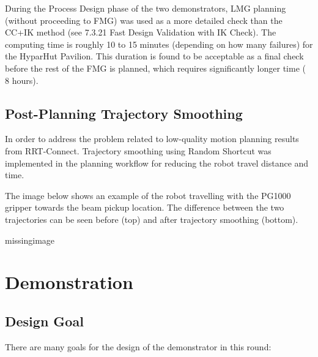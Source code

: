 During the Process Design phase of the two demonstrators, LMG planning (without proceeding to FMG) was used as a more detailed check than the CC+IK method (see 7.3.21 Fast Design Validation with IK Check). The computing time is roughly 10 to 15 minutes (depending on how many failures) for the HyparHut Pavilion. This duration is found to be acceptable as a final check before the rest of the FMG is planned, which requires significantly longer time (~ 8 hours).

\subsection{Post-Planning Trajectory Smoothing}
In order to address the problem related to low-quality motion planning results from RRT-Connect. Trajectory smoothing using Random Shortcut \parencite{zhaoTrajectorySmoothingUsing2015} was implemented in the planning workflow for reducing the robot travel distance and time.

The image below shows an example of the robot travelling with the PG1000 gripper towards the beam pickup location. The difference between the two trajectories can be seen before (top) and after trajectory smoothing (bottom). 

missingimage

\section{Demonstration}
\subsection{Design Goal}
There are many goals for the design of the demonstrator in this round:

